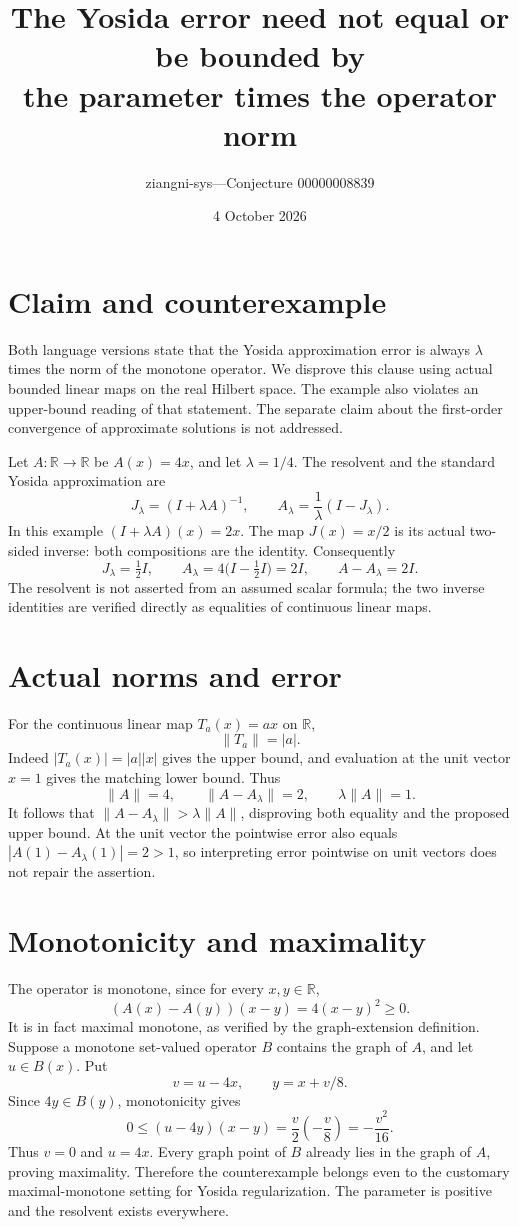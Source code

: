 \documentclass[11pt,a4paper]{article}
\title{The Yosida error need not equal or be bounded by\\the parameter times the operator norm}
\author{ziangni-sys\quad---\quad Conjecture 00000008839}
\date{4 October 2026}
\begin{document}
\maketitle
\section*{Claim and counterexample}
Both language versions state that the Yosida approximation error is always $\lambda$ times the norm of the monotone operator. We disprove this clause using actual bounded linear maps on the real Hilbert space. The example also violates an upper-bound reading of that statement. The separate claim about the first-order convergence of approximate solutions is not addressed.

Let $A:\mathbb R\to\mathbb R$ be $A(x)=4x$, and let $\lambda=1/4$. The resolvent and the standard Yosida approximation are
\[
 J_\lambda=(I+\lambda A)^{-1},\qquad
 A_\lambda=\frac1\lambda(I-J_\lambda).
\]
In this example $(I+\lambda A)(x)=2x$. The map $J(x)=x/2$ is its actual two-sided inverse: both compositions are the identity. Consequently
\[
 J_\lambda=\tfrac12I,\qquad
 A_\lambda=4\bigl(I-\tfrac12I\bigr)=2I,\qquad
 A-A_\lambda=2I.
\]
The resolvent is not asserted from an assumed scalar formula; the two inverse identities are verified directly as equalities of continuous linear maps.

\section*{Actual norms and error}
For the continuous linear map $T_a(x)=ax$ on $\mathbb R$,
\[
 \|T_a\|=|a|.
\]
Indeed $|T_a(x)|=|a||x|$ gives the upper bound, and evaluation at the unit vector $x=1$ gives the matching lower bound. Thus
\[
 \|A\|=4,\qquad \|A-A_\lambda\|=2,
 \qquad \lambda\|A\|=1.
\]
It follows that $\|A-A_\lambda\|>\lambda\|A\|$, disproving both equality and the proposed upper bound. At the unit vector the pointwise error also equals $|A(1)-A_\lambda(1)|=2>1$, so interpreting error pointwise on unit vectors does not repair the assertion.

\newpage
\section*{Monotonicity and maximality}
The operator is monotone, since for every $x,y\in\mathbb R$,
\[
 (A(x)-A(y))(x-y)=4(x-y)^2\geq0.
\]
It is in fact maximal monotone, as verified by the graph-extension definition. Suppose a monotone set-valued operator $B$ contains the graph of $A$, and let $u\in B(x)$. Put
\[
 v=u-4x,\qquad y=x+v/8.
\]
Since $4y\in B(y)$, monotonicity gives
\[
 0\leq(u-4y)(x-y)
 =\frac v2\left(-\frac v8\right)=-\frac{v^2}{16}.
\]
Thus $v=0$ and $u=4x$. Every graph point of $B$ already lies in the graph of $A$, proving maximality. Therefore the counterexample belongs even to the customary maximal-monotone setting for Yosida regularization. The parameter is positive and the resolvent exists everywhere.
\end{document}
